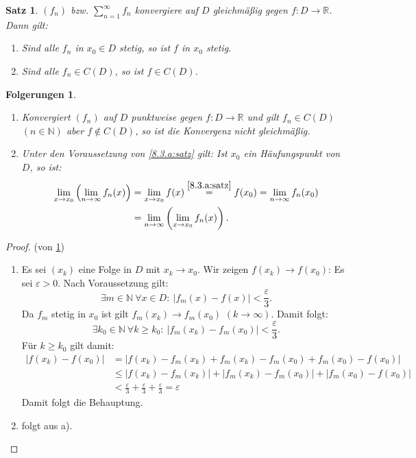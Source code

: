 \documentclass[12pt]{extreport} %
\newcommand{\N}{\mathbb{N}}
\newcommand{\R}{\mathbb{R}}
\theoremstyle{named}
\theoremstyle{itshape}
\newtheorem{satz}[unnamedtheorem]{Satz}
\theoremstyle{normal}
\newtheorem*{folgerungen}{Folgerungen}
\begin{document}
{\begin{satz} \label{8.3:satz}
	$(f_{n})$ bzw. $\sum_{n=1}^{\infty} f_{n}$ konvergiere auf $D$ gleichmä{\ss}ig gegen $f \colon D \rightarrow \R$. Dann gilt:
	\begin{enumerate}
		\item Sind alle $f_{n}$ in $x_{0} \in D$ stetig, so ist $f$ in $x_{0}$ stetig. \label{8.3.a:satz}
		\item Sind alle $f_{n} \in C(D)$, so ist $f \in C(D)$. \label{8.3.b:satz}
	\end{enumerate}
\end{satz}

\begin{folgerungen} ~\
	\begin{enumerate}
		\item Konvergiert $(f_{n})$ auf $D$ punktweise gegen $f \colon D \rightarrow \R$ und gilt $f_{n} \in C(D)$ $(n\in \N)$ aber $f \notin C(D)$, 
		so ist die Konvergenz nicht gleichmä{\ss}ig.
		\item Unter den Voraussetzung von \ref{8.3.a:satz} gilt: Ist $x_{0}$ ein Häufungspunkt von $D$, so ist:
			\begin{align*}
				\lim_{x \rightarrow x_{0}} \left( \lim_{n \rightarrow \infty} f_{n}(x) \right) & = \lim_{x \rightarrow x_{0}} f(x) \overset{\ref{8.3.a:satz}}{=} f(x_{0}) = \lim_{n \rightarrow \infty} f_{n}(x_{0}) \\
					& = \lim_{n \rightarrow \infty} \left( \lim_{x \rightarrow x_{0}} f_{n}(x) \right).  
			\end{align*}
	\end{enumerate}	
\end{folgerungen}

\begin{proof}(von \ref{8.3:satz}) \
	\begin{enumerate}
		\item Es sei $(x_k)$ eine Folge in $D$ mit $x_k \to x_0$. Wir zeigen $f(x_k) \to f(x_0)$: Es sei $\varepsilon > 0$. Nach Voraussetzung gilt:
		        $$
		        \exists m \in \N ~\forall x \in D: ~  |f_{m}(x) - f(x)| < \frac{\varepsilon}{3}.
		        $$
		        Da $f_{m}$ stetig in $x_{0}$ ist gilt $f_m(x_k) \to f_m(x_0)$ $(k \to \infty)$. Damit folgt:
		        $$
		        \exists k_0 \in \N ~\forall k \ge k_0: ~ |f_{m}(x_k) - f_{m}(x_{0})| < \frac{\varepsilon}{3}.
		        $$
		        Für $k \ge k_0$ gilt damit:
			\begin{align*}
				|f(x_k) - f(x_{0})| & = |f(x_k) - f_{m}(x_k) + f_{m}(x_k) - f_{m}(x_{0}) + f_{m}(x_{0}) - f(x_{0})| \\ 
					& \leq |f(x_k) - f_{m}(x_k) | + | f_{m}(x_k) - f_{m}(x_{0})| + | f_{m}(x_{0}) - f(x_{0})| \\
					& < \frac{\varepsilon}{3} +  \frac{\varepsilon}{3} + \frac{\varepsilon}{3} = \varepsilon
			\end{align*}
			Damit folgt die Behauptung.
		\item folgt aus a).	
	\end{enumerate}
\end{proof}


}
\end{document}
